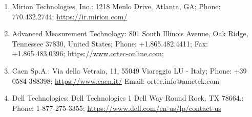 \documentclass[12pt]{article}
\begin{document}
\begin{table}[!h]
\begin{tabular}{c|cccc}
    \end{tabular}
    \begin{enumerate}[label=\alph*]
        \item\label{addr:mirion}
        Mirion Technologies, Inc.:
        1218 Menlo Drive,
        Atlanta, GA;
        Phone: 770.432.2744;
        \url{https://ir.mirion.com/}
        \item\label{addr:ortec}
        Advanced Measurement Technology:
        801 South Illinois Avenue,
        Oak Ridge, Tennessee 37830,
        United States;
        Phone: +1.865.482.4411;
        Fax: +1.865.483.0396;
        \url{https://www.ortec-online.com};
        \item\label{addr:caen}
        Caen Sp.A.:
        Via della Vetraia, 11, 55049 Viareggio LU - Italy;
        Phone: +39 0584 388398;
        \url{https://www.caen.it/}
        Email: ortec.info@ametek.com
        \item\label{addr:dell}
        Dell Technologies:
        Dell Technologies
        1 Dell Way
        Round Rock, TX 78664.;
        Phone: 1-877-275-3355;
        \url{https://www.dell.com/en-us/lp/contact-us}
    \end{enumerate}
\end{table}
\FloatBarrier
\end{document}

